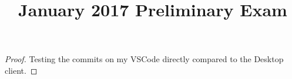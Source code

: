\documentclass[11pt,twoside]{amsart}
\title{January 2017 Preliminary Exam}
\author{}
\theoremstyle{plain}
\begin{document}
\maketitle

\begin{proof}
    Testing the commits on my VSCode directly compared to the Desktop client.
\end{proof}
\end{document}
